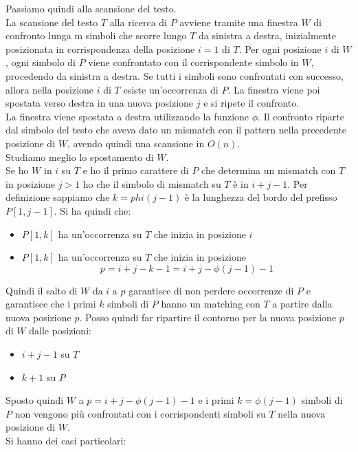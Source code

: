 Passiamo quindi alla scansione del testo.\\
La scansione del testo $T$ alla ricerca  di  $P$ avviene tramite una finestra
$W$ di confronto lunga m simboli che scorre lungo $T$ da sinistra a destra,
inizialmente posizionata in corrispondenza della posizione $i=1$ di $T$. Per
ogni posizione $i$ di $W$, ogni simbolo di $P$ viene confrontato con
il corrispondente simbolo in $W$, procedendo da sinistra a destra. Se
tutti i simboli sono confrontati con successo, allora nella posizione $i$ di $T$
esiste un’occorrenza di $P$. La finestra viene poi spostata verso destra in
una nuova posizione $j$ e si ripete il confronto.\\
La finestra viene spostata a destra utilizzando la funzione $\phi$. Il confronto
riparte dal simbolo del testo che aveva dato un mismatch con il pattern nella
precedente posizione di $W$, avendo quindi una scansione in $O(n)$.\\
Studiamo meglio lo spostamento di $W$.\\
Se ho $W$ in $i$ su $T$ e ho il primo carattere di $P$ che determina un mismatch
con $T$ in posizione $j>1$ ho che il simbolo di mismatch su $T$ è in
$i+j-1$. Per definizione sappiamo che $k=phi(j-1)$ è la lunghezza del bordo del
prefisso $P[1,j-1]$. Si ha quindi che:
\begin{itemize}
  \item $P[1,k]$ ha un’occorrenza su $T$ che inizia in posizione $i$
  \item $P[1,k]$ ha un’occorrenza su $T$ che inizia in posizione
  \[p=i+j-k-1=i+j-\phi(j-1)-1\]
\end{itemize}
Quindi il salto di $W$ da $i$ a $p$ garantisce di non perdere occorrenze di $P$
e garantisce che i primi $k$ simboli di $P$ hanno un matching con $T$ a partire
dalla nuova posizione $p$. Posso quindi far ripartire il contorno per la nuova
posizione $p$ di $W$ dalle posizioni:
\begin{itemize}
  \item $i+j-1$ su $T$
  \item $k+1$ su $P$
\end{itemize}
Sposto quindi $W$ a $p=i+j-\phi(j-1)-1$ e i primi $k=\phi(j-1)$ simboli di $P$
non vengono più confrontati con i corrispondenti simboli su $T$ nella nuova
posizione di $W$.\\
Si hanno dei casi particolari:
